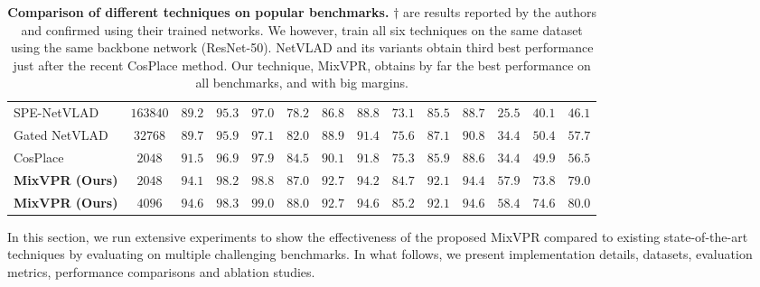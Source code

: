 \documentclass[10pt,twocolumn,letterpaper]{article}
\begin{document}
\begin{table*}[tbh]
{\begin{tabular}{|l|c|ccc|ccc|ccc|ccc|}
SPE-NetVLAD \cite{yu2019spatial}                &$163840$ & $89.2$          & $95.3$          & $97.0$          & $78.2$          & $86.8$          & $88.8$          & $73.1$          & $85.5$          & $88.7$          & $25.5$          & $40.1$          & $46.1$          \\
Gated NetVLAD \cite{zhang2021vector}            &$32768$ & $89.7$          & $95.9$          & $97.1$          & $82.0$          & $88.9$          & $91.4$          & $75.6$          & $87.1$          & $90.8$          & $34.4$          & $50.4$          & $57.7$          \\
CosPlace \cite{berton2022rethinking}            &$2048$ & $91.5$          & $96.9$          & $97.9$          & $84.5$          & $90.1$          & $91.8$          & $75.3$          & $85.9$          & $88.6$          & $34.4$          & $49.9$          & $56.5$          \\ \hline
\textbf{MixVPR (Ours) }                         &$2048$ & $94.1$          & $98.2$          & $98.8$          & $87.0$          & $92.7$          & $94.2$          & $84.7$          & $92.1$          & $94.4$          & $57.9$          & $73.8$          & $79.0$ \\
\textbf{MixVPR (Ours) }                         &$4096$ & $\mathbf{94.6}$ & $\mathbf{98.3}$ & $\mathbf{99.0}$ & $\mathbf{88.0}$ & $\mathbf{92.7}$ & $\mathbf{94.6}$ & $\mathbf{85.2}$ & $\mathbf{92.1}$ & $\mathbf{94.6}$ & $\mathbf{58.4}$ & $\mathbf{74.6}$ & $\mathbf{80.0}$ \\ \hline
\end{tabular}}
\caption{\textbf{Comparison of different techniques on popular benchmarks.} $\dagger$ are results reported by the authors and confirmed using their trained networks. We however, train all six techniques on the same dataset using the same backbone network (ResNet-50). NetVLAD and its variants obtain third best performance just after the recent CosPlace method. Our technique, MixVPR, obtains by far the best performance on all benchmarks, and with big margins.}
\label{tab:sota}
\end{table*}
In this section, we run extensive experiments to show the effectiveness of the proposed MixVPR compared to existing state-of-the-art techniques by evaluating on multiple challenging benchmarks. In what follows, we present implementation details, datasets, evaluation metrics, performance comparisons and ablation studies.
\end{document}
